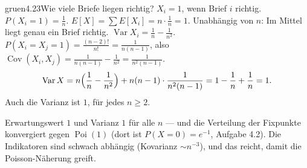 \begin{loesungkarte}{gruen}{4.23}{Wie viele Briefe liegen richtig?}
$X_i = 1$, wenn Brief $i$ richtig. $P(X_i = 1) = \frac1n$. $E[X] = \sum E[X_i] = n\cdot\frac1n = 1$. Unabhängig von $n$: Im Mittel liegt genau ein Brief richtig.
$\operatorname{Var}X_i = \frac1n - \frac1{n^{2}}$. $P(X_i = X_j = 1) = \frac{(n - 2)!}{n!} = \frac1{n(n - 1)}$, also $\operatorname{Cov}(X_i, X_j) = \frac1{n(n - 1)} - \frac1{n^{2}} = \frac1{n^{2}(n - 1)}$.
\[ \operatorname{Var}X = n\Bigl(\frac1n - \frac1{n^{2}}\Bigr) + n(n - 1)\cdot\frac1{n^{2}(n - 1)} = 1 - \frac1n + \frac1n = 1 . \]
Auch die Varianz ist $1$, für jedes $n\ge2$.
\begin{mitnehmen}\kastentext
Erwartungswert $1$ und Varianz $1$ für alle $n$ --- und die Verteilung der Fixpunkte konvergiert gegen $\operatorname{Poi}(1)$ (dort ist $P(X = 0) = e^{-1}$, Aufgabe 4.2). Die Indikatoren sind schwach abhängig (Kovarianz $\sim n^{-3}$), und das reicht, damit die Poisson-Näherung greift.
\end{mitnehmen}
\end{loesungkarte}

